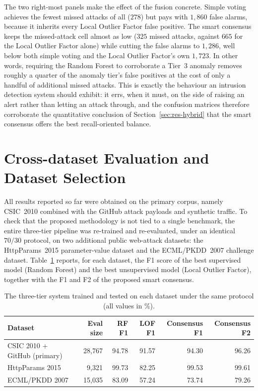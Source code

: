 \documentclass[12pt,a4paper]{report}
\begin{document}
The two right-most panels make the effect of the fusion concrete. Simple
voting achieves the fewest missed attacks of all ($278$) but pays with
$1{,}860$ false alarms, because it inherits every Local Outlier Factor false
positive. The smart consensus keeps the missed-attack cell almost as low
($325$ missed attacks, against $665$ for the Local Outlier Factor alone)
while cutting the false alarms to $1{,}286$, well below both simple voting
and the Local Outlier Factor's own $1{,}723$. In other words, requiring the
Random Forest to corroborate a Tier~3 anomaly removes roughly a quarter of the
anomaly tier's false positives at the cost of only a handful of additional
missed attacks. This is exactly the behaviour an intrusion detection system
should exhibit: it errs, when it must, on the side of raising an alert rather
than letting an attack through, and the confusion matrices therefore
corroborate the quantitative conclusion of Section~\ref{sec:res-hybrid} that
the smart consensus offers the best recall-oriented balance.

\section{Cross-dataset Evaluation and Dataset Selection}
\label{sec:res-crossdataset}

All results reported so far were obtained on the primary corpus, namely
CSIC~2010 combined with the GitHub attack payloads and synthetic traffic. To
check that the proposed methodology is not tied to a single benchmark, the
entire three-tier pipeline was re-trained and re-evaluated, under an
identical $70/30$ protocol, on two additional public web-attack datasets:
the HttpParams~2015 parameter-value dataset and the ECML/PKDD~2007 challenge
dataset. Table~\ref{tab:crossdataset} reports, for each dataset, the F1 score
of the best supervised model (Random Forest) and the best unsupervised model
(Local Outlier Factor), together with the F1 and F2 of the proposed smart
consensus.

\begin{table}[ht]
  \centering
  \caption{The three-tier system trained and tested on each dataset under the
           same protocol (all values in \%).}
  \label{tab:crossdataset}
  \renewcommand{\arraystretch}{1.35}
  \setlength{\tabcolsep}{8pt}
  \footnotesize
  \begin{tabular}{|l|r|r|r|r|r|}
    \hline
    \textbf{Dataset} & \textbf{Eval size} & \textbf{RF F1} &
    \textbf{LOF F1} & \textbf{Consensus F1} & \textbf{Consensus F2} \\
    \hline
    CSIC 2010 + GitHub (primary) & 28{,}767 & 94.78 & 91.57 & 94.30 & 96.26 \\
    \hline
    HttpParams 2015 & 9{,}321 & 99.73 & 82.25 & 99.53 & 99.61 \\
    \hline
    ECML/PKDD 2007 & 15{,}035 & 83.09 & 57.24 & 73.74 & 79.26 \\
    \hline
  \end{tabular}
\end{table}
\end{document}
